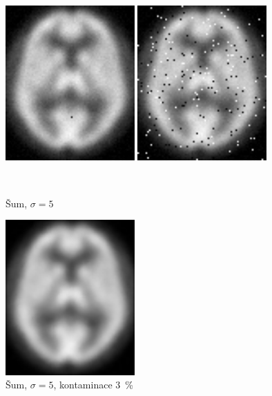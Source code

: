     \begin{figure}[H]
        \begin{minipage}[l]{0.5\textwidth}
            \center
            \includegraphics[width = 140pt]{src/8Appendix/final/5-30noise.png}
        \end{minipage}
        \begin{minipage}[r]{0.5\textwidth}
            \center
            \includegraphics[width = 140pt]{src/8Appendix/final/5-30contaminated.png}
        \end{minipage}
        \\
        \begin{minipage}[l]{0.5\textwidth}
            \caption{Šum, $\sigma = 5$}
        \end{minipage}
        \begin{minipage}[r]{0.5\textwidth}
            \caption{Šum, $\sigma = 5$, kontaminace 3~\%}
        \end{minipage}
        \begin{minipage}[l]{0.5\textwidth}
            \center
            \includegraphics[width = 140pt]{src/8Appendix/final/5-30bes.png}

\end{minipage}
\end{figure}
